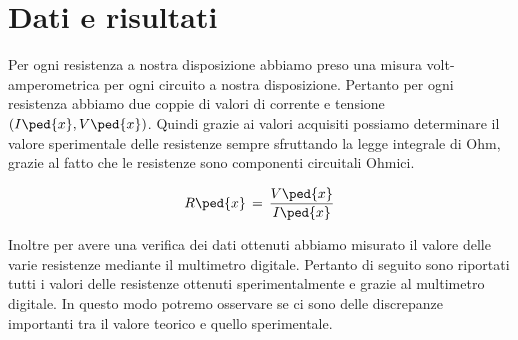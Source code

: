 \section*{Dati e risultati}

Per ogni resistenza a nostra disposizione abbiamo preso una misura volt-amperometrica per ogni circuito a nostra disposizione. Pertanto per ogni resistenza abbiamo due coppie di valori di corrente e tensione $(I\ped{x}, V\ped{x})$.
Quindi grazie ai valori acquisiti possiamo determinare il valore sperimentale delle resistenze sempre sfruttando la legge integrale di Ohm, grazie al fatto che le resistenze sono componenti circuitali Ohmici.

\begin{equation}
	R\ped{x} \,=\, \frac{V\ped{x}}{I\ped{x}}
\end{equation}

Inoltre per avere una verifica dei dati ottenuti abbiamo misurato il valore delle varie resistenze mediante il multimetro digitale.
Pertanto di seguito sono riportati tutti i valori delle resistenze ottenuti sperimentalmente e grazie al multimetro digitale. In questo modo potremo osservare se ci sono delle discrepanze importanti tra il valore teorico e quello sperimentale. 

